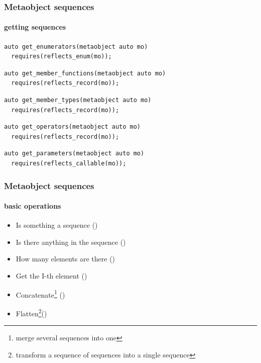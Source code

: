 \documentclass[compress,table,xcolor=table]{beamer}
\begin{document}
\begin{frame}[fragile]
  \frametitle{Metaobject sequences}
  \framesubtitle{getting sequences}
  \begin{lstlisting}[language=c++2x,basicstyle=\small\ttfamily]
auto get_enumerators(metaobject auto mo)
  requires(reflects_enum(mo));
  \end{lstlisting}
  \vfill
  \begin{lstlisting}[language=c++2x,basicstyle=\small\ttfamily]
auto get_member_functions(metaobject auto mo)
  requires(reflects_record(mo));
  \end{lstlisting}
  \vfill
  \begin{lstlisting}[language=c++2x,basicstyle=\small\ttfamily]
auto get_member_types(metaobject auto mo)
  requires(reflects_record(mo));
  \end{lstlisting}
  \vfill
  \begin{lstlisting}[language=c++2x,basicstyle=\small\ttfamily]
auto get_operators(metaobject auto mo)
  requires(reflects_record(mo));
  \end{lstlisting}
  \vfill
  \begin{lstlisting}[language=c++2x,basicstyle=\small\ttfamily]
auto get_parameters(metaobject auto mo)
  requires(reflects_callable(mo));
  \end{lstlisting}
\end{frame}
\begin{frame}
  \frametitle{Metaobject sequences}
  \framesubtitle{basic operations}
  \larger
  \begin{itemize}
    \item Is something a sequence ()
    \item Is there anything in the sequence ()
    \item How many elements are there ()
    \item Get the I-th element ()
    \item Concatenate\footnote{merge several sequences into one}
      ()
    \item Flatten\footnote{transform a sequence of sequences into a single
      sequence}()
  \end{itemize}
\end{frame}
\end{document}
